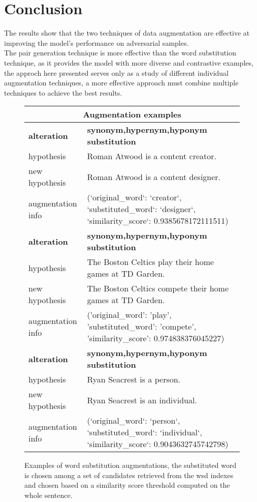 \documentclass[11pt,a4paper]{article}
\begin{document}
\section{Conclusion}
The results show that the two techniques of data augmentation are effective at improving the model's performance on adversarial samples.
\\The pair generation technique is more effective than the word substitution technique, as it provides the model with more diverse and contrastive examples, the approch here presented serves
only as a study of different individual augmentation techniques, a more effective approach must combine multiple techniques to achieve the best results.


\clearpage %

\begin{figure*}[t]
\centering
\begin{adjustbox}{width=\textwidth}
\begin{tabular}{|p{}|p{}|}
\hline
\multicolumn{2}{|c|}{\textbf{Augmentation examples}} \\
\hline
\textbf{alteration} & \textbf{synonym,hypernym,hyponym substitution} \\
hypothesis & Roman Atwood is a content creator. \\
new hypothesis & Roman Atwood is a content designer. \\
augmentation info & (`original\_word`: `creator`, `substituted\_word`: `designer`, `similarity\_score`: 0.9385678172111511) \\
\hline
\textbf{alteration} & \textbf{synonym,hypernym,hyponym substitution} \\
hypothesis & The Boston Celtics play their home games at TD Garden. \\
new hypothesis & The Boston Celtics compete their home games at TD Garden. \\
augmentation info & ('original\_word': 'play', 'substituted\_word': 'compete', 'similarity\_score': 0.974838376045227) \\
\hline
\textbf{alteration} & \textbf{synonym,hypernym,hyponym substitution} \\
hypothesis & Ryan Seacrest is a person. \\
new hypothesis & Ryan Seacrest is an individual. \\
augmentation info & (`original\_word`: `person`, `substituted\_word`: `individual`, `similarity\_score`: 0.9043632745742798) \\
\hline
\end{tabular}
\end{adjustbox}
\caption{Examples of word substitution augmentations, the substituted word is chosen among a set of candidates retrieved from the wsd indexes 
and chosen based on a similarity score threshold computed on the whole sentence.}
\label{fig:alteration-examples}
\end{figure*}
\end{document}
